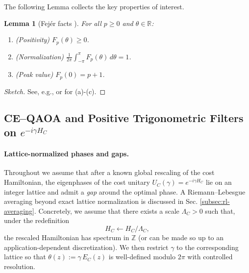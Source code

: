 \documentclass[a4paper,unpublished,onecolumn,11pt]{quantumarticle}
\newtheorem{lemma}[theorem]{Lemma}
\theoremstyle{definition}
\theoremstyle{remark}
\begin{document}
The following Lemma collects the key properties of interest.
\begin{lemma}[Fejér facts {\cite{Katznelson2004}}]\label{lem:fejer-facts}
For all \(p\ge 0\) and \(\theta\in\mathbb R\):
\begin{enumerate}[label=(\alph*),leftmargin=2.2em]
\item (Positivity) \(F_p(\theta)\ge 0\).
\item (Normalization) \(\displaystyle \frac{1}{2\pi}\int_{-\pi}^{\pi} F_p(\theta)\,d\theta = 1\).
\item (Peak value) \(F_p(0)=p+1\).
\end{enumerate}
\end{lemma}

\begin{proof}[Sketch]
See, e.g., \cite[§1.2--1.3]{SteinShakarchi2003Fourier} or \cite[§II.1]{Katznelson2004} for (a)-(c).
\end{proof}




\subsection{CE–QAOA and Positive Trigonometric Filters on \texorpdfstring{$e^{-i\gamma H_C}$}{exp(-i gamma H	extunderscore C)}}
\label{sec:fejer}

\paragraph{Lattice-normalized phases and gaps.}
Throughout we assume that after a known global rescaling of the cost Hamiltonian, the eigenphases of the cost unitary $U_C(\gamma)=e^{-i\gamma H_C}$ lie on an integer lattice and admit a \emph{gap} around the optimal phase. A Riemann--Lebesgue averaging beyond exact lattice normalization is discussed in Sec. \ref{subsec:rl-averaging}. Concretely, we assume that there exists a scale $\Lambda_C>0$
such that, under the redefinition
\[
H_C \longleftarrow H_C/\Lambda_C,
\]
the rescaled Hamiltonian has spectrum in $\mathbb Z$
(or can be made so up to an application-dependent discretization). We then restrict $\gamma$ to the corresponding lattice so that $\theta(z):=\gamma\,E_C(z)$ is well-defined modulo $2\pi$ with controlled resolution. 
\end{document}
